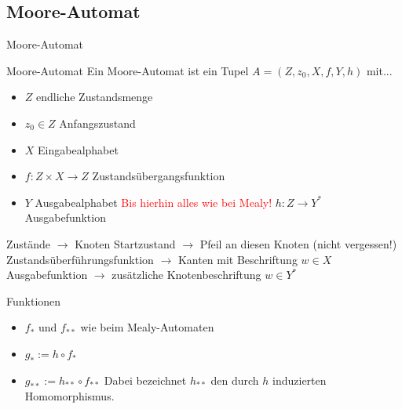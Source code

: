 \documentclass[handout]{beamer}
\begin{document}
\subsection{Moore-Automat}

\begin{frame}{Moore-Automat}
	\begin{block}{Moore-Automat}
		Ein Moore-Automat ist ein Tupel $A = (Z, z_0, X, f, Y, h)$ mit...
		\begin{itemize}
			\item $Z$ endliche Zustandsmenge 
			\item $z_0 \in Z$ Anfangszustand 
			\item $X$ Eingabealphabet 
			\item $f: Z \times X \rightarrow Z$ Zustandsübergangsfunktion 
			\item $Y$ Ausgabealphabet 
			\pitem[$\rightarrow$] \textcolor{red}{Bis hierhin alles wie bei Mealy!}
			\pitem $h: Z \rightarrow Y^*$ Ausgabefunktion 
		\end{itemize}
	\end{block}

	\pause

	\begin{itemize}
		\pitem Zustände $\rightarrow$ Knoten
		\pitem Startzustand $\rightarrow$ Pfeil an diesen Knoten (nicht vergessen!)
		\pitem Zustandsüberführungsfunktion $\rightarrow$ Kanten mit Beschriftung \(w \in X\)
		\pitem Ausgabefunktion $\rightarrow$ zusätzliche Knotenbeschriftung \(w \in Y^*\)
	\end{itemize}
\end{frame}

\begin{frame}{Funktionen}
	\begin{itemize}
		\item \(f_*\) und \(f_{**}\) wie beim Mealy-Automaten
		\item \(g_* := h \circ f_*\)
		\item \(g_{**} := h_{**} \circ f_{**}\)
		Dabei bezeichnet \(h_{**}\) den durch \(h\) induzierten Homomorphismus.
	\end{itemize}
\end{frame}
\end{document}
